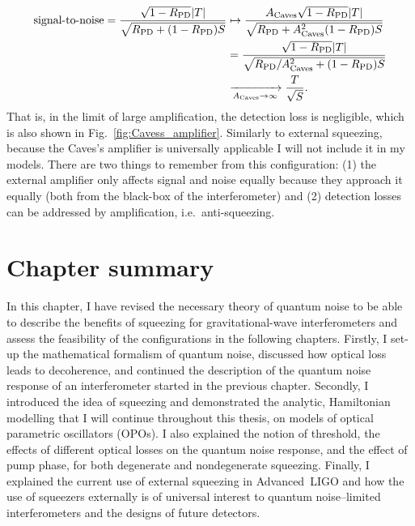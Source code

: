 \begin{align}\text{signal-to-noise} = \frac{\sqrt{1-R_\text{PD}}\abs{T}}{\sqrt{R_\text{PD}+(1-R_\text{PD})S}}&\mapsto\frac{A_\text{Caves}\sqrt{1-R_\text{PD}}\abs{T}}{\sqrt{R_\text{PD}+A_\text{Caves}^2(1-R_\text{PD})S}}\\
&=\frac{\sqrt{1-R_\text{PD}}\abs{T}}{\sqrt{R_\text{PD}/A_\text{Caves}^2+(1-R_\text{PD})S}}\\
&\xrightarrow[A_\text{Caves}\rightarrow\infty]{} \frac{T}{\sqrt S}.
\end{align}
That is, in the limit of large amplification, the detection loss is negligible, which is also shown in Fig.~\ref{fig:Cavess_amplifier}. Similarly to external squeezing, because the Caves's amplifier is universally applicable I will not include it in my models. There are two things to remember from this configuration: (1) the external amplifier only affects signal and noise equally because they approach it equally (both from the black-box of the interferometer) and (2) detection losses can be addressed by amplification, i.e.\ anti-squeezing.


\section{Chapter summary}

In this chapter, I have revised the necessary theory of quantum noise to be able to describe the benefits of squeezing for gravitational-wave interferometers and assess the feasibility of the configurations in the following chapters. Firstly, I set-up the mathematical formalism of quantum noise, discussed how optical loss leads to decoherence, and continued the description of the quantum noise response of an interferometer started in the previous chapter. Secondly, I introduced the idea of squeezing and demonstrated the analytic, Hamiltonian modelling that I will continue throughout this thesis, on models of optical parametric oscillators (OPOs). I also explained the notion of threshold, the effects of different optical losses on the quantum noise response, and the effect of pump phase, for both degenerate and nondegenerate squeezing. Finally, I explained the current use of external squeezing in Advanced~LIGO and how the use of squeezers externally is of universal interest to quantum noise--limited interferometers and the designs of future detectors.


